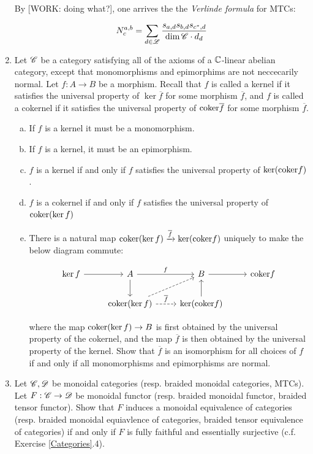 \documentclass{article}
\theoremstyle{definition}
\numberwithin{figure}{section}
\begin{document}
\begin{enumerate}[\thesection .1.]
By [WORK: doing what?], one arrives the the \textit{Verlinde formula} for MTCs:

$$N^{a,b}_{c}=\sum_{d\in \mathscr{L}} \frac{s_{a,d} s_{b,d}s_{c^*,d}}{\dim{\mathscr{C}}\cdot d_d}$$

\item Let $\mathscr{C}$ be a category satisfying all of the axioms of a $\mathbb{C}$-linear abelian category, except that monomorphisms and epimorphims are not neccecarily normal. Let $f:A\to B$ be a morphism. Recall that $f$ is called a kernel if it satisfies the universal property of $\ker \overline{f}$ for some morphism $\overline{f}$, and $f$ is called a cokernel if it satisfies the universal property of $\mathrm{coker} \overline{f}$ for some morphism $\overline{f}$.

\begin{enumerate}[(a)]
\item If $f$ is a kernel it must be a monomorphism.
\item If $f$ is a kernel, it must be an epimorphism.
\item $f$ is a kernel if and only if $f$ satisfies the universal property of $\ker(\mathrm{coker} f)$.
\item  $f$ is a cokernel if and only if $f$ satisfies the universal property of $\mathrm{coker}(\ker f)$
\item There is a natural map $\mathrm{coker}(\ker f)\xrightarrow{\overline{f}} \ker(\mathrm{coker} f)$ uniquely to make the below diagram commute:

\[\begin{tikzcd}
	{\ker f} & A & B & {\coker f} \\
	& {\coker (\ker f)} & {\ker (\coker f)}
	\arrow[from=1-1, to=1-2]
	\arrow["f", from=1-2, to=1-3]
	\arrow[from=1-3, to=1-4]
	\arrow[from=1-2, to=2-2]
	\arrow[from=2-3, to=1-3]
	\arrow[dashed, from=2-2, to=1-3]
	\arrow["{\overline{f}}", dashed, from=2-2, to=2-3]
\end{tikzcd}\]

where the map $\mathrm{coker} (\ker f)\to B$ is first obtained by the universal property of the cokernel, and the map $\overline{f}$ is then obtained by the universal property of the kernel. Show that $\overline{f}$ is an isomorphism for all choices of $f$ if and only if all monomorphisms and epimorphisms are normal.
\end{enumerate}

\item Let $\mathscr{C},\mathscr{D}$ be monoidal categories (resp. braided monoidal categories, MTCs). Let $F:\mathscr{C}\to \mathscr{D}$ be monoidal functor (resp. braided monoidal functor, braided tensor functor). Show that $F$ induces a monoidal equivalence of categories (resp. braided monoidal equiavlence of categories, braided tensor equivalence of categories) if and only if $F$ is fully faithful and essentially surjective (c.f. Exercise \ref{Categories}.4). 


\end{enumerate}
\end{document}
